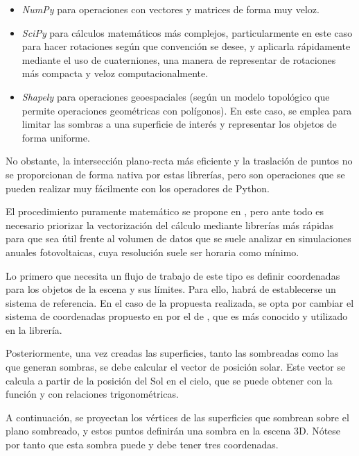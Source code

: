 \begin{itemize}
    \item \textit{NumPy} para operaciones con vectores y matrices de forma muy veloz.
    \item \textit{SciPy} para cálculos matemáticos más complejos, particularmente en este caso para hacer rotaciones según que convención se desee, y aplicarla rápidamente mediante el uso de cuaterniones, una manera de representar de rotaciones más compacta y veloz computacionalmente.
    \item \textit{Shapely} para operaciones geoespaciales (según un modelo topológico que permite operaciones geométricas con polígonos). En este caso, se emplea para limitar las sombras a una superficie de interés y representar los objetos de forma uniforme.
\end{itemize}

No obstante, la intersección plano-recta más eficiente y la traslación de puntos no se proporcionan de forma nativa por estas librerías, pero son operaciones que se pueden realizar muy fácilmente con los operadores de Python.

El procedimiento puramente matemático se propone en \cite{Zainali_Ma_Lu_Stridh_Avelin_Amaducci_Colauzzi_Campana_2023}, pero ante todo es necesario priorizar la vectorización del cálculo mediante librerías más rápidas para que sea útil frente al volumen de datos que se suele analizar en simulaciones anuales fotovoltaicas, cuya resolución suele ser horaria como mínimo.

Lo primero que necesita un flujo de trabajo de este tipo es definir coordenadas para los objetos de la escena y sus límites. Para ello, habrá de establecerse un sistema de referencia. En el caso de la propuesta realizada, se opta por cambiar el sistema de coordenadas propuesto en \cite{Zainali_Ma_Lu_Stridh_Avelin_Amaducci_Colauzzi_Campana_2023} por el de \cite{Anderson_Mikofski_2020}, que es más conocido y utilizado en la librería.

Posteriormente, una vez creadas las superficies, tanto las sombreadas como las que generan sombras, se debe calcular el vector de posición solar. Este vector se calcula a partir de la posición del Sol en el cielo, que se puede obtener con la función  y con relaciones trigonométricas.

A continuación, se proyectan los vértices de las superficies que sombrean sobre el plano sombreado, y estos puntos definirán una sombra en la escena 3D. Nótese por tanto que esta sombra puede y debe tener tres coordenadas.

